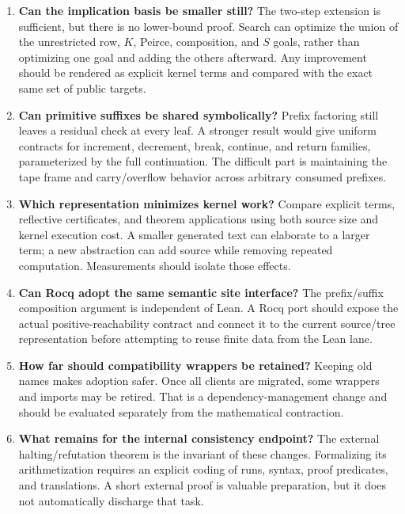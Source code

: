 \documentclass[11pt,letterpaper]{article}
\begin{document}
\begin{enumerate}
\item \textbf{Can the implication basis be smaller still?}
      The two-step extension is sufficient, but there is no lower-bound proof.
      Search can optimize the union of the unrestricted row, $K$, Peirce,
      composition, and $S$ goals, rather than optimizing one goal and adding the
      others afterward. Any improvement should be rendered as explicit kernel
      terms and compared with the exact same set of public targets.
\item \textbf{Can primitive suffixes be shared symbolically?}
      Prefix factoring still leaves a residual check at every leaf. A stronger
      result would give uniform contracts for increment, decrement, break,
      continue, and return families, parameterized by the full continuation.
      The difficult part is maintaining the tape frame and carry/overflow
      behavior across arbitrary consumed prefixes.
\item \textbf{Which representation minimizes kernel work?}
      Compare explicit terms, reflective certificates, and theorem applications
      using both source size and kernel execution cost. A smaller generated text
      can elaborate to a larger term; a new abstraction can add source while
      removing repeated computation. Measurements should isolate those effects.
\item \textbf{Can Rocq adopt the same semantic site interface?}
      The prefix/suffix composition argument is independent of Lean. A Rocq
      port should expose the actual positive-reachability contract and connect
      it to the current source/tree representation before attempting to reuse
      finite data from the Lean lane.
\item \textbf{How far should compatibility wrappers be retained?}
      Keeping old names makes adoption safer. Once all clients are migrated,
      some wrappers and imports may be retired. That is a dependency-management
      change and should be evaluated separately from the mathematical contraction.
\item \textbf{What remains for the internal consistency endpoint?}
      The external halting/refutation theorem is the invariant of these changes.
      Formalizing its arithmetization requires an explicit coding of runs,
      syntax, proof predicates, and translations. A short external proof is
      valuable preparation, but it does not automatically discharge that task.
\end{enumerate}
\end{document}
